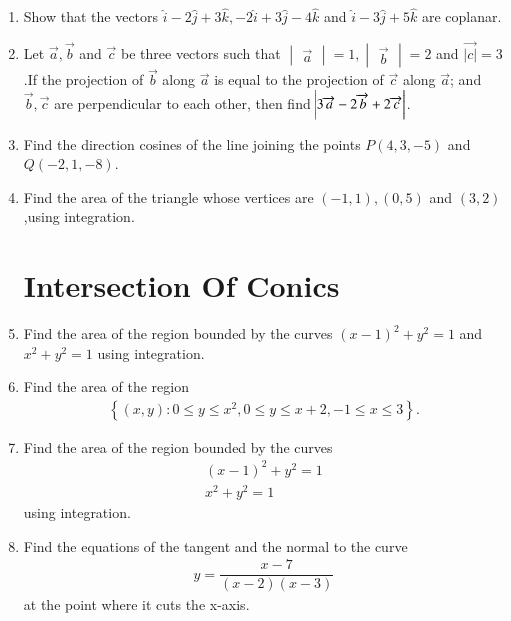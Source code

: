 \documentclass[12pt,-letter paper]{article}
\providecommand{\mydet}[1]{\ensuremath{\begin{vmatrix}#1\end{vmatrix}}}
\providecommand{\cbrak}[1]{\ensuremath{\left\{#1\right\}}}
\providecommand{\brak}[1]{\ensuremath{\left(#1\right)}}
\begin{document}
\begin{enumerate}
\item Show that the vectors $\hat{i} -2 \hat{j}+ 3 \hat{k},-2 \hat{i}+ 3  \hat{j} -4 \hat{k}$ and $\hat{i} -3 \hat{j}+ 5 \hat{k}$ are coplanar.

\item Let  $ \overrightarrow a ,\overrightarrow b$ and $\overrightarrow c $ be three vectors such that $\mydet{\overrightarrow{a}}  = 1 ,\mydet{\overrightarrow{b}}= 2$ and $\overrightarrow{|c|} =3$ .If the projection of $\overrightarrow b $ along $\overrightarrow a $ is equal to the projection of $\overrightarrow c $ along $ \overrightarrow a $; and $\overrightarrow b,\overrightarrow c $ are perpendicular to each other, then find $\abs{3\overrightarrow a-2\overrightarrow b +2\overrightarrow c}$.

\item Find the direction cosines of the line joining the points $P \brak{4, 3, -5}$ and $Q  \brak{-2, 1, -8}$.

\item Find the area of the triangle whose vertices are $\brak{-1, 1},\brak {0, 5}$ and $\brak {3, 2}$,using integration.

\section{Intersection Of Conics}

\item Find the area of the region bounded by the curves $\brak{x-1}^{2} +y^{2} = 1$ and $ x^{2}+y^{2}  = 1$ using integration.

\item Find the area of the region 
\begin{align*}
    \cbrak{(x,y):0\leq y \leq x^{2},0 \leq y \leq x +2 , -1 \leq x \leq 3}.
\end{align*}

\item Find the area of the region bounded by the curves  
\begin{align*}
\brak{x-1}^2 +y^2=1 \\  x^2+y^2=1
\end{align*}
using integration.

\item Find the equations of the tangent and the normal to the curve 
\begin{align*}
y=\dfrac{x-7}{(x-2)(x-3)}    
\end{align*}
at the point where it cuts the x-axis.


\end{enumerate}
\end{document}
